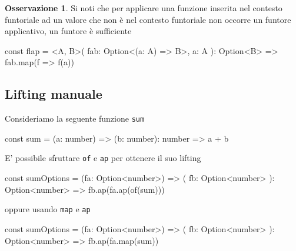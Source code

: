 \documentclass[12pt]{article}
\theoremstyle{definition}
\newtheorem{observation}{Osservazione}[section]
\newenvironment{code}
  {\vspace{0.5cm} \VerbatimEnvironment\begin{typescriptcode}}
  {\end{typescriptcode} \vspace{0.2cm}}
\begin{document}






\begin{observation}
Si noti che per applicare una funzione inserita nel contesto funtoriale ad un valore
che non è nel contesto funtoriale non occorre un funtore applicativo, un funtore è sufficiente
\end{observation}

\begin{code}
const flap = <A, B>(
  fab: Option<(a: A) => B>,
  a: A
): Option<B> => fab.map(f => f(a))
\end{code}

\subsection{Lifting manuale}

Consideriamo la seguente funzione \texttt{sum}

\begin{code}
const sum = (a: number) => (b: number): number => a + b
\end{code}

E' possibile sfruttare \texttt{of} e \texttt{ap} per ottenere il suo lifting

\begin{code}
const sumOptions = (fa: Option<number>) => (
  fb: Option<number>
): Option<number> => fb.ap(fa.ap(of(sum)))
\end{code}

oppure usando \texttt{map} e \texttt{ap}

\begin{code}
const sumOptions = (fa: Option<number>) => (
  fb: Option<number>
): Option<number> => fb.ap(fa.map(sum))
\end{code}
\end{document}
